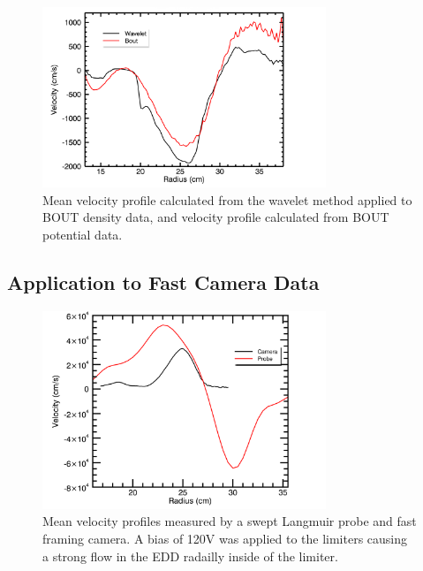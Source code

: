\documentclass[%
 reprint,
 amsmath,amssymb,
 aps,
]{revtex4-1}
\begin{document}
\begin{figure}[!htbp]
\centerline{}
\includegraphics[width=8.5cm]{plot_bout_wavelet_vel}
\caption{\label{fig:plot_bout_wavelet_vel}Mean velocity profile calculated from the wavelet method applied to BOUT density data, and velocity profile calculated from BOUT potential data. }
\end{figure}



%
%
%
%
\subsection{Application to Fast Camera Data}%

\begin{figure}[!htbp]
\centerline{}
\includegraphics[width=8.5cm]{plot_Velocity_cam_probe_bias_120V}
\caption{\label{fig:plot_Velocity_cam_probe_bias_120V} Mean velocity profiles measured by a swept Langmuir probe and fast framing camera.  A bias of 120V was applied to the limiters causing a strong flow in the EDD radailly inside of the limiter. }
\end{figure}
\end{document}
